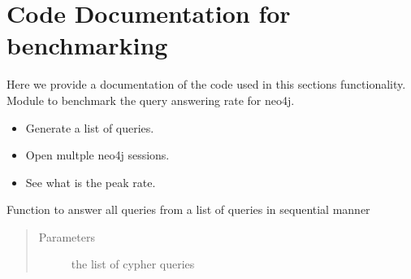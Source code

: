 \documentclass[letterpaper,10pt,english]{sphinxmanual}
\begin{document}
\section{Code Documentation for benchmarking}
\label{\detokenize{benchmarking:code-documentation-for-benchmarking}}
Here we provide a documentation of the code used in this sections functionality.
\label{\detokenize{benchmarking:module-query_answering}}
Module to benchmark the query answering rate for neo4j.
\begin{itemize}
\item {} 
Generate a list of queries.

\item {} 
Open multple neo4j sessions.

\item {} 
See what is the peak rate.

\end{itemize}

\begin{fulllineitems}
\label{\detokenize{benchmarking:query_answering.answer_queries}}
Function to answer all queries from a list of queries in sequential manner
\begin{quote}\begin{description}
\item[{Parameters}] \leavevmode
{} \textendash{} the list of cypher queries

\end{description}\end{quote}

\end{fulllineitems}

\end{document}

